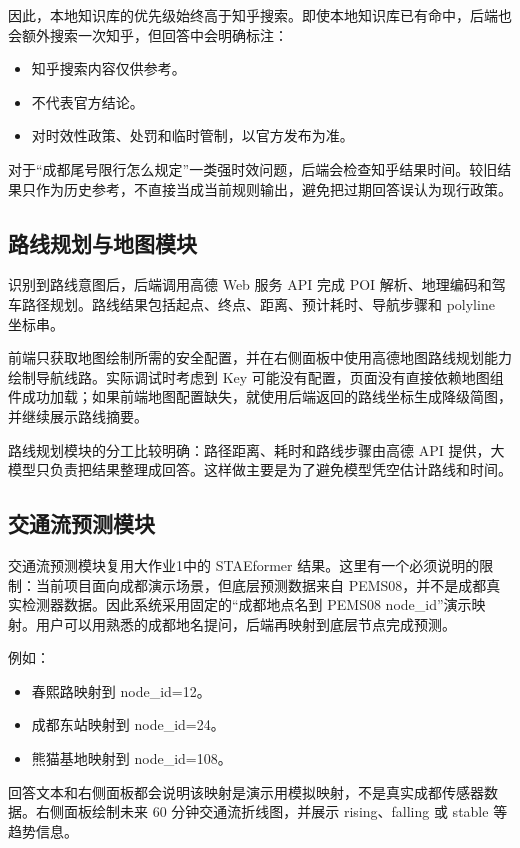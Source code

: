 \documentclass[bwprint]{report}
\begin{document}
因此，本地知识库的优先级始终高于知乎搜索。即使本地知识库已有命中，后端也会额外搜索一次知乎，但回答中会明确标注：
\begin{itemize}
    \item 知乎搜索内容仅供参考。
    \item 不代表官方结论。
    \item 对时效性政策、处罚和临时管制，以官方发布为准。
\end{itemize}

对于``成都尾号限行怎么规定''一类强时效问题，后端会检查知乎结果时间。较旧结果只作为历史参考，不直接当成当前规则输出，避免把过期回答误认为现行政策。

\subsection{路线规划与地图模块}
识别到路线意图后，后端调用高德 Web 服务 API 完成 POI 解析、地理编码和驾车路径规划。路线结果包括起点、终点、距离、预计耗时、导航步骤和 polyline 坐标串。

前端只获取地图绘制所需的安全配置，并在右侧面板中使用高德地图路线规划能力绘制导航线路。实际调试时考虑到 Key 可能没有配置，页面没有直接依赖地图组件成功加载；如果前端地图配置缺失，就使用后端返回的路线坐标生成降级简图，并继续展示路线摘要。

路线规划模块的分工比较明确：路径距离、耗时和路线步骤由高德 API 提供，大模型只负责把结果整理成回答。这样做主要是为了避免模型凭空估计路线和时间。

\subsection{交通流预测模块}
交通流预测模块复用大作业1中的 STAEformer 结果。这里有一个必须说明的限制：当前项目面向成都演示场景，但底层预测数据来自 PEMS08，并不是成都真实检测器数据。因此系统采用固定的``成都地点名到 PEMS08 node\_id''演示映射。用户可以用熟悉的成都地名提问，后端再映射到底层节点完成预测。

例如：
\begin{itemize}
    \item 春熙路映射到 node\_id=12。
    \item 成都东站映射到 node\_id=24。
    \item 熊猫基地映射到 node\_id=108。
\end{itemize}

回答文本和右侧面板都会说明该映射是演示用模拟映射，不是真实成都传感器数据。右侧面板绘制未来 60 分钟交通流折线图，并展示 rising、falling 或 stable 等趋势信息。
\end{document}
